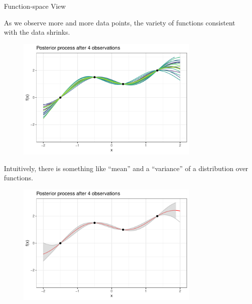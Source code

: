 \documentclass[11pt,compress,t,notes=noshow, xcolor=table]{beamer}
\begin{document}
\begin{vbframe}{Function-space View}

As we observe more and more data points, the variety of functions consistent with the data shrinks. 
  \begin{figure}
    \includegraphics[width=0.8\textwidth]{figure/gp_sample/2_4.pdf}
  \end{figure}

\framebreak 

Intuitively, there is something like \enquote{mean} and a \enquote{variance} of a distribution over functions. 

  \begin{figure}
    \includegraphics[width=0.8\textwidth]{figure/gp_sample/2_mean_var.pdf}
  \end{figure}

\end{vbframe}






\endlecture
\end{document}
